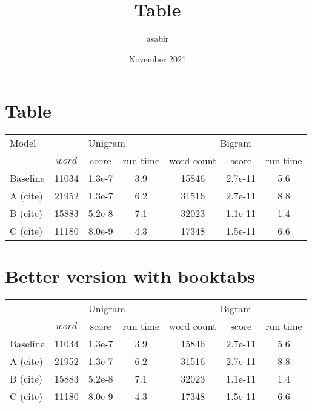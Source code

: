 \documentclass{article}
\title{Table}
\author{asabir }
\date{November 2021}
\begin{document}
\section{Table}
\begin{tabular}{|l|c|c|c|c|c|c|}\hline
Model & \multicolumn{3}{c|}{Unigram} & \multicolumn{3}{c|}{Bigram}\\
           & $word$  & score &  run time    & word count  & score  & run time  \\\hline
Baseline   & 11034 & 1.3e-7 & 3.9 & 15846 & 2.7e-11 & 5.6 \\
A (cite)  & 21952 & 1.3e-7 & 6.2 & 31516 & 2.7e-11 & 8.8 \\
B (cite)  & 15883 & 5.2e-8 & 7.1 & 32023 & 1.1e-11 & 1.4\\
C (cite)   & 11180 & 8.0e-9 & 4.3 & 17348 & 1.5e-11 & 6.6 \\\hline




\end{tabular}

\section{Better version with booktabs}

\begin{tabular}{lcccccc}\toprule
& \multicolumn{3}{c}{Unigram} & \multicolumn{3}{c}{Bigram}
\\\cmidrule(lr){2-4}\cmidrule(lr){5-7}
           & $word$  & score &  run time    & word count  & score  & run time  \\\hline
Baseline   & 11034 & 1.3e-7 & 3.9 & 15846 & 2.7e-11 & 5.6 \\
A (cite)  & 21952 & 1.3e-7 & 6.2 & 31516 & 2.7e-11 & 8.8 \\
B (cite)  & 15883 & 5.2e-8 & 7.1 & 32023 & 1.1e-11 & 1.4\\
C (cite)   & 11180 & 8.0e-9 & 4.3 & 17348 & 1.5e-11 & 6.6 \\\bottomrule
\end{tabular}
\end{document}
